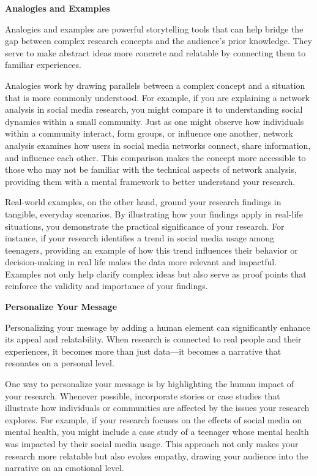 \documentclass[
]{book}
\begin{document}
\textbf{Analogies and Examples}

Analogies and examples are powerful storytelling tools that can help bridge the gap between complex research concepts and the audience's prior knowledge. They serve to make abstract ideas more concrete and relatable by connecting them to familiar experiences.

Analogies work by drawing parallels between a complex concept and a situation that is more commonly understood. For example, if you are explaining a network analysis in social media research, you might compare it to understanding social dynamics within a small community. Just as one might observe how individuals within a community interact, form groups, or influence one another, network analysis examines how users in social media networks connect, share information, and influence each other. This comparison makes the concept more accessible to those who may not be familiar with the technical aspects of network analysis, providing them with a mental framework to better understand your research.

Real-world examples, on the other hand, ground your research findings in tangible, everyday scenarios. By illustrating how your findings apply in real-life situations, you demonstrate the practical significance of your research. For instance, if your research identifies a trend in social media usage among teenagers, providing an example of how this trend influences their behavior or decision-making in real life makes the data more relevant and impactful. Examples not only help clarify complex ideas but also serve as proof points that reinforce the validity and importance of your findings.

\textbf{Personalize Your Message}

Personalizing your message by adding a human element can significantly enhance its appeal and relatability. When research is connected to real people and their experiences, it becomes more than just data---it becomes a narrative that resonates on a personal level.

One way to personalize your message is by highlighting the human impact of your research. Whenever possible, incorporate stories or case studies that illustrate how individuals or communities are affected by the issues your research explores. For example, if your research focuses on the effects of social media on mental health, you might include a case study of a teenager whose mental health was impacted by their social media usage. This approach not only makes your research more relatable but also evokes empathy, drawing your audience into the narrative on an emotional level.
\end{document}
